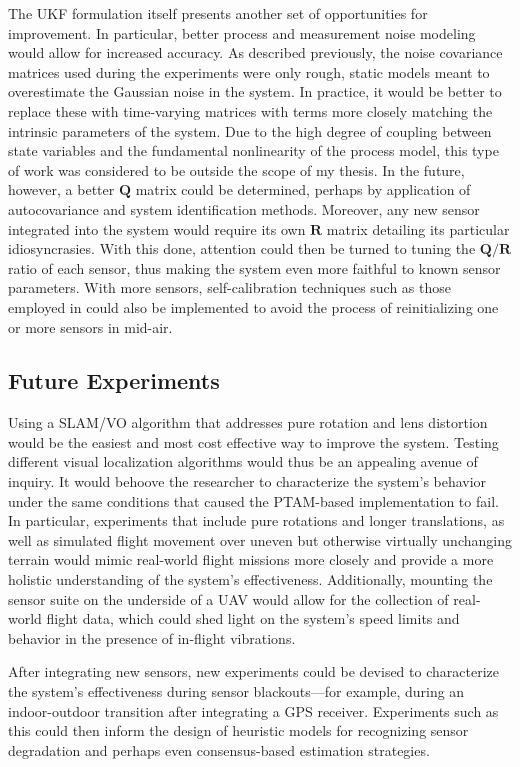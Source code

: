The UKF formulation itself presents another set of opportunities for improvement. In particular, better process and measurement noise modeling would allow for increased accuracy. As described previously, the noise covariance matrices used during the experiments were only rough, static models meant to overestimate the Gaussian noise in the system. In practice, it would be better to replace these with time-varying matrices with terms more closely matching the intrinsic parameters of the system. Due to the high degree of coupling between state variables and the fundamental nonlinearity of the process model, this type of work was considered to be outside the scope of my thesis. In the future, however, a better $\mathbf{Q}$ matrix could be determined, perhaps by application of autocovariance and system identification methods. Moreover, any new sensor integrated into the system would require its own $\mathbf{R}$ matrix detailing its particular idiosyncrasies. With this done, attention could then be turned to tuning the $\mathbf{Q} / \mathbf{R}$ ratio of each sensor, thus making the system even more faithful to known sensor parameters. With more sensors, self-calibration techniques such as those employed in \cite{Weiss2012} could also be implemented to avoid the process of reinitializing one or more sensors in mid-air.

\subsection{Future Experiments}

Using a SLAM/VO algorithm that addresses pure rotation and lens distortion would be the easiest and most cost effective way to improve the system. Testing different visual localization algorithms would thus be an appealing avenue of inquiry. It would behoove the researcher to characterize the system's behavior under the same conditions that caused the PTAM-based implementation to fail. In particular, experiments that include pure rotations and longer translations, as well as simulated flight movement over uneven but otherwise virtually unchanging terrain would mimic real-world flight missions more closely and provide a more holistic understanding of the system's effectiveness. Additionally, mounting the sensor suite on the underside of a UAV would allow for the collection of real-world flight data, which could shed light on the system's speed limits and behavior in the presence of in-flight vibrations.

After integrating new sensors, new experiments could be devised to characterize the system's effectiveness during sensor blackouts---for example, during an indoor-outdoor transition after integrating a GPS receiver. Experiments such as this could then inform the design of heuristic models for recognizing sensor degradation and perhaps even consensus-based estimation strategies. 

